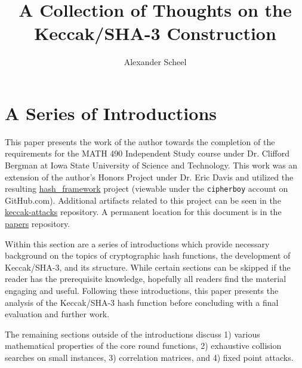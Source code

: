 \documentclass[10pt,twocolumn,twoside]{pnas-new}
\title{A Collection of Thoughts on the Keccak/SHA-3 Construction}
\author{Alexander Scheel}
\affil{Iowa State University}
\begin{document}
\verticaladjustment{-2pt}

\maketitle

% 

\section{A Series of Introductions} \label{sec:intro}
    This paper presents the work of the author towards the completion of the
requirements for the MATH 490 Independent Study course under Dr. Clifford
Bergman at Iowa State University of Science and Technology. This work was an
extension of the author's Honors Project under Dr. Eric Davis and utilized
the resulting
\href{https://github.com/cipherboy/hash\_framework}{hash\_framework} project
(viewable under the \texttt{cipherboy} account on GitHub.com).
Additional artifacts related to this project can be seen in the
\href{https://github.com/cipherboy/keccak-attacks}{keccak-attacks} repository.
A permanent location for this document is in the
\href{https://github.com/cipherboy/papers}{papers} repository.

    Within this section are a series of introductions which provide necessary
background on the topics of cryptographic hash functions, the development of
Keccak/SHA-3, and its structure. While certain sections can be skipped if the
reader has the prerequisite knowledge, hopefully all readers find the material
engaging and useful. Following these introductions, this paper presents the
analysis of the Keccak/SHA-3 hash function before concluding with a final
evaluation and further work.

    The remaining sections outside of the introductions discuss 1) various
mathematical properties of the core round functions, 2) exhaustive collision
searches on small instances, 3) correlation matrices, and 4) fixed point
attacks.

\end{document}
